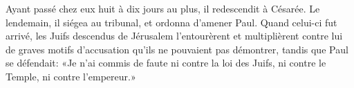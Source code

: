 Ayant passé chez eux huit à dix jours au plus, il redescendit à Césarée.
	Le lendemain, il siégea au tribunal, et ordonna d’amener Paul.
Quand celui-ci fut arrivé,
	les Juifs descendus de Jérusalem l’entourèrent
		et multiplièrent contre lui de graves motifs d’accusation
		qu’ils ne pouvaient pas démontrer,
	tandis que Paul se défendait:
	«Je n’ai commis de faute ni contre la loi des Juifs,
	ni contre le Temple, ni contre l’empereur.»
